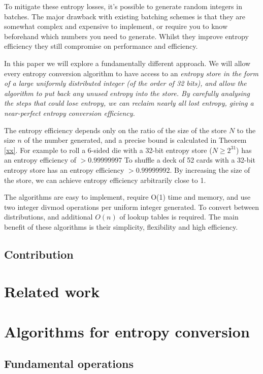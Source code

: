 \documentclass[12pt]{article}
\begin{document}
To mitigate these entropy losses, it's possible to generate random integers in batches. The major drawback with existing batching schemes is that they are somewhat complex and expensive to implement, or require you to know beforehand which numbers you need to generate. Whilst they improve entropy efficiency they still compromise on performance and efficiency.

In this paper we will explore a fundamentally different approach. We will allow every entropy conversion algorithm to have access to an \em entropy store \em in the form of a large uniformly distributed integer (of the order of 32 bits), and allow the algorithm to put back any unused entropy into the store. By carefully analysing the steps that could lose entropy, we can reclaim nearly all lost entropy, giving a near-perfect entropy conversion efficiency. 

The entropy efficiency depends only on the ratio of the size of the store $N$ to the size $n$ of the number generated, and a precise bound is calculated in Theorem \ref{xx}. For example to roll a 6-sided die with a 32-bit entropy store ($N\ge2^{31}$) has an entropy efficiency of $>0.99999997$ To shuffle a deck of 52 cards with a 32-bit entropy store has an entropy efficiency $>0.99999992$. By increasing the size of the store, we can achieve entropy efficiency arbitrarily close to 1.

The algorithms are easy to implement, require O(1) time and memory, and use two integer divmod operations per uniform integer generated. To convert between distributions, and additional $O(n)$ of lookup tables is required. The main benefit of these algorithms is their simplicity, flexibility and high efficiency.

\subsection {Contribution}

\section{Related work}


\section{Algorithms for entropy conversion}

\subsection{Fundamental operations}
\end{document}
